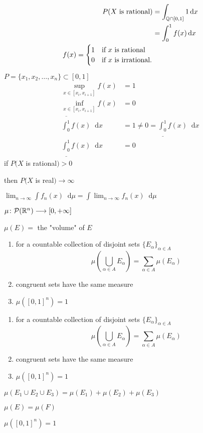 \documentclass{article}
\newcommand*\intd{\mathop{}\!\mathrm{d}}
\begin{document}
\begin{align}
    P(X\text{ is rational}) &= \int _{\bQ\cap[0, 1]}1\intd x \nonumber \\
    &= \int_0^1f(x)\intd x \nonumber \\
    f(x) = 
    \begin{cases}
        1 &\text{if }x \text{ is rational}\\
        0 &\text{if }x \text{ is irrational.}
    \end{cases} \nonumber
\end{align}

$P=\{x_1, x_2, \dots, x_n\}\subset [0, 1]$
\begin{align}
    \underset{x\in [x_i, x_{i+1}]}{\sup}f(x)&=1 \nonumber \\
    \underset{x\in [x_i, x_{i+1}]}{\inf}f(x)&=0 \nonumber \\
    \overline{\int_0^1}f(x)\intd x &=1\neq 0 = \underline{\int_0^1}f(x)\intd x \nonumber \\
    \underline{\int_0^1}f(x)\intd x &=0
\end{align}
if $P(X$ is rational$)>0$

then $P(X$ is real$)\to\infty$

$\lim_{n\to\infty}\int f_n(x)\intd \mu = \int \lim_{n\to\infty} f_n(x)\intd \mu$

$\mu\colon \mathcal{P}(\mathbb{R}^n)\longrightarrow [0, +\infty]$

$\mu(E)=$ the "volume" of $E$

\begin{enumerate}
    \item for a countable collection of disjoint sets $\{E_\alpha\}_{\alpha \in A}$
    $$
        \mu\left(\bigcup_{\alpha \in A}E_\alpha\right) = \sum_{\alpha \in A}\mu(E_\alpha)
    $$
    \item congruent sets have the same measure
    \item $\mu([0, 1]^n)=1$
\end{enumerate}
\begin{enumerate}
    \item for a countable collection of disjoint sets $\{E_\alpha\}_{\alpha \in A}$
    $$
        \mu\left(\bigcup_{\alpha \in A}E_\alpha\right) = \sum_{\alpha \in A}\mu(E_\alpha)
    $$
    \item congruent sets have the same measure
    \item $\mu([0, 1]^n)=1$
\end{enumerate}


$\mu(E_1\cup E_2\cup E_3)=\mu(E_1) + \mu(E_2) + \mu(E_3)$

$\mu(E)=\mu(F)$

$\mu([0, 1]^n)=1$
\end{document}
